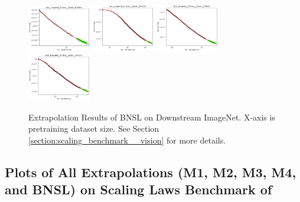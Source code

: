 \documentclass{article} %
\begin{document}
\begin{figure}
\includegraphics[width=0.245\textwidth]{figures/scaling_laws_benchmark_dataset_plots/few_shot_25___MiX_B_16.png}
\includegraphics[width=0.245\textwidth]{figures/scaling_laws_benchmark_dataset_plots/few_shot_25___MiX_L_16.png}
\includegraphics[width=0.245\textwidth]{figures/scaling_laws_benchmark_dataset_plots/few_shot_25___ViT_B_16.png}
\includegraphics[width=0.245\textwidth]{figures/scaling_laws_benchmark_dataset_plots/few_shot_25___ViT_S_16.png}

    \caption{
    Extrapolation Results of BNSL on Downstream ImageNet. X-axis is pretraining dataset size. See Section \ref{section:scaling_benchmark__vision} for more details.
    }
    \label{fig:scaling_laws_benchmark_dataset__ImageNet}
\end{figure}

\iffalse



\clearpage
\clearpage
\subsection{Plots of All Extrapolations (M1, M2, M3, M4, and BNSL) on Scaling Laws Benchmark of \cite{Alabdulmohsi2022revisiting}}
\label{section:Plots_of_All_Extrapolations}
\end{document}
